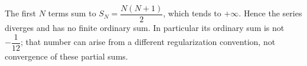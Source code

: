 The first $N$ terms sum to $S_N=\dfrac{N(N+1)}{2}$, which tends to $+\infty$. Hence the series diverges and has no finite ordinary sum. In particular its ordinary sum is not $-\dfrac{1}{12}$; that number can arise from a different regularization convention, not convergence of these partial sums.
